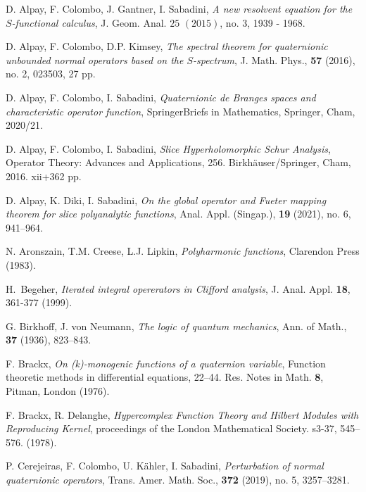\documentclass[reqno,11pt]{amsart}
\numberwithin{equation}{section}
\theoremstyle{definition}
\begin{document}
\begin{thebibliography}{99}


 D. Alpay, F. Colombo, J. Gantner, I. Sabadini, \emph{A new resolvent equation for the $S$-functional calculus}, J. Geom. Anal. $25$ $(2015)$, no. $3$, 1939 - 1968.

 D. Alpay, F. Colombo, D.P. Kimsey,
 {\em The spectral theorem for quaternionic unbounded normal operators based on the $S$-spectrum},
 J. Math. Phys., {\bf 57} (2016), no. 2, 023503, 27 pp.







D. {Alpay}, F. {Colombo},  I. {Sabadini},
 {\em Quaternionic de Branges spaces and characteristic operator function},
 SpringerBriefs in Mathematics, Springer, Cham, 2020/21.

 D. {Alpay}, F. {Colombo},  I. {Sabadini},
 {\em Slice Hyperholomorphic Schur Analysis},
 Operator Theory: Advances and Applications, 256. Birkh\"auser/Springer, Cham, 2016. xii+362 pp.

 D. Alpay, K. Diki, I. Sabadini, \emph{On the global operator and Fueter mapping theorem for slice polyanalytic functions},
 Anal. Appl. (Singap.), {\bf 19} (2021), no. 6, 941--964.


 N. Aronszain, T.M. Creese, L.J. Lipkin, \emph{Polyharmonic functions}, Clarendon Press (1983).

 H.~Begeher, \emph{Iterated integral opererators in Clifford analysis}, J. Anal. Appl. \textbf{18}, 361-377 (1999).


 G. Birkhoff, J. von Neumann, {\em The logic of quantum mechanics}, Ann. of
Math., {\bf 37} (1936), 823--843.

 F. Brackx, \emph{On (k)-monogenic functions of a quaternion variable}, Function theoretic methods in differential equations, 22–44. Res. Notes in Math. \textbf{8}, Pitman, London (1976).

 F. Brackx, R. Delanghe, \emph{Hypercomplex Function Theory and Hilbert Modules with Reproducing Kernel}, proceedings of the London Mathematical Society. s3-37, 545–576. (1978).


 P. Cerejeiras, F. Colombo, U. K\"ahler, I.  Sabadini, {\em Perturbation of normal quaternionic operators},
  Trans. Amer. Math. Soc., { \bf 372} (2019), no. 5, 3257--3281.





\end{thebibliography}
\end{document}
